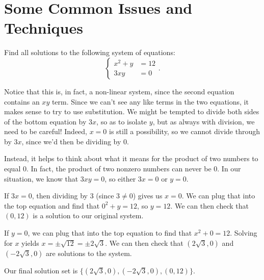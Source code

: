 \documentclass[nooutcomes]{ximera}
\begin{document}
\section{Some Common Issues and Techniques}
\begin{example}
Find all solutions to the following system of equations:
$$
\begin{cases}
x^2 + y & =  12 \\
3xy & = 0
\end{cases}.
$$
\end{example}
\begin{explanation}
Notice that this is, in fact, a non-linear system, since the second equation contains an $xy$ term. Since we can't see any like terms in the two equations, it makes sense to try to use substitution. We might be tempted to divide both sides of the bottom equation by $3x$, so as to isolate $y$, but as always with division, we need to be careful! Indeed, $x = 0$ is still a possibility, so we cannot divide through by $3x$, since we'd then be dividing by $0$. 

Instead, it helps to think about what it means for the product of two numbers to equal 0. In fact, the product of two nonzero numbers can never be 0. In our situation, we know that $3xy= 0$, so either $3x = 0$ or $y = 0$. 

If $3x = 0$, then dividing by 3 (since $3 \ne 0$) gives us $x = 0$. We can plug that into the top equation and find that $0^2 + y = 12$, so $y = 12$. We can then check that $(0, 12)$ is a solution to our original system. 

If $y = 0$, we can plug that into the top equation to find that $x^2 + 0 = 12$. Solving for $x$ yields $x = \pm \sqrt{12} = \pm 2\sqrt{3}$. We can then check that $(2\sqrt{3}, 0)$ and $(-2\sqrt{3}, 0)$ are solutions to the system. 

Our final solution set is $\{(2\sqrt{3}, 0), (-2\sqrt{3}, 0), (0, 12)\}$. 
\end{explanation}
\end{document}
